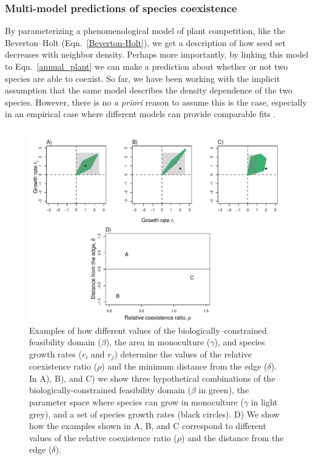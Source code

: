 \begin{refsection}
\subsubsection*{Multi-model predictions of species coexistence}

By parameterizing a phenomenological model of plant competition, like the Beverton--Holt (Eqn.~\ref{Beverton-Holt}), we get a description of how seed set decreases with neighbor density. Perhaps more importantly, by linking this model to  Eqn.~\ref{annual_plant} we can make a prediction about whether or not two species are able to coexist. So far, we have been working with the implicit assumption that the same model describes the density dependence of the two species. However, there is no \textit{a priori} reason to assume this is the case, especially in an empirical case where different models can provide comparable fits \citep{hart2018quantify}.


\begin{figure}[H]
  \centerline{\includegraphics[width=1.1\textwidth]{figures/chapter3_fig2.pdf}}
  \caption[Examples of how different values of the biologically--constrained feasibility domain ($\beta$), the area in monoculture ($\gamma$), and species growth rates ($r_i$ and $r_j$) determine the values of the relative coexistence ratio ($\rho$) and the minimum distance from the edge ($\delta$).]{Examples of how different values of the biologically--constrained feasibility domain ($\beta$), the area in monoculture ($\gamma$), and species growth rates ($r_i$ and $r_j$) determine the values of the relative coexistence ratio ($\rho$) and the minimum distance from the edge ($\delta$). In A), B), and C) we show three hypothetical combinations of the biologically-constrained feasibility domain ($\beta$ in green), the parameter space where species can grow in monoculture ($\gamma$ in light grey), and a set of species growth rates (black circles). D) We show how the examples shown in A, B, and C correspond to different values of the relative coexistence ratio ($\rho$) and the distance from the edge ($\delta$).  }
  \label{fig:rho_delta}
\end{figure}



\end{refsection}
